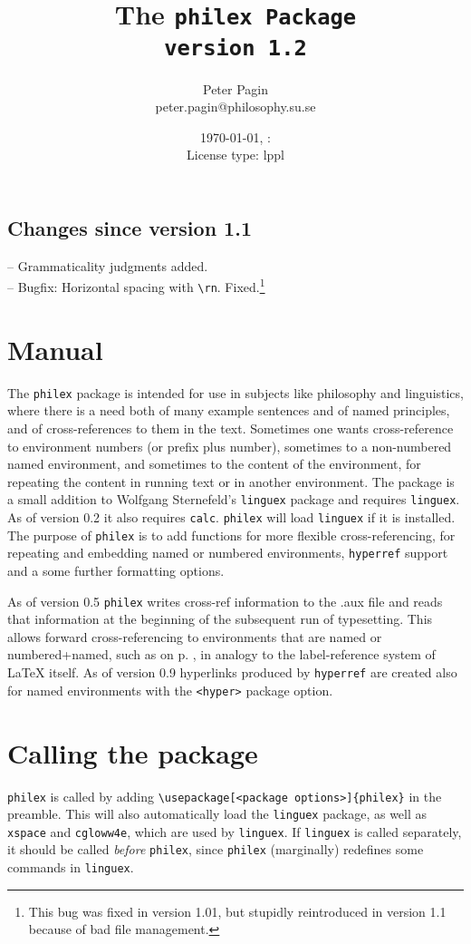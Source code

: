 \documentclass[10pt]{article}
\makeatletter
\newcommand{\emp}{\emph}
\def\now{\nowh:\nowm\\License type: lppl}
\def\aut{Peter Pagin\\ peter.pagin@philosophy.su.se}
\makeatother
\begin{document}
\title{The \tt philex \rm Package \\ version 1.2}
\author{\aut}
\date{\today, \now}
\maketitle
\reversemarginpar
\setlength{\marginparwidth}{3cm}
\subsection*{Changes since version 1.1}
-- Grammaticality judgments added.\\
-- Bugfix: Horizontal spacing with \verb+\rn+. Fixed.\footnote
	{This bug was fixed in version 1.01, but stupidly reintroduced in version 1.1 because of bad file management.}





\section*{Manual}
The \verb+philex+ package is intended for use in subjects like philosophy and linguistics, where there is a need both of many example sentences and of named principles, and of cross-references to them in the text. Sometimes one wants cross-reference to environment numbers (or prefix plus number), sometimes to a non-numbered named environment, and sometimes to the content of the environment, for repeating the content in running text or in another environment. The package is a small addition to Wolfgang Sternefeld's \verb+linguex+ package and requires \verb+linguex+. As of version 0.2 it also requires \verb+calc+. \verb+philex+ will load \verb+linguex+ if it is installed. The purpose of \verb+philex+ is to add functions for more flexible cross-referencing, for repeating and embedding named or numbered environments, \verb+hyperref+ support and a some further formatting options.

As of version 0.5 \verb+philex+ writes cross-ref information to the .aux file and reads that information at the beginning of the subsequent run of typesetting. This allows forward cross-referencing to environments that are named or numbered+named, such as  on p. \pageref{clauses}, 
in analogy to the label-reference system of LaTeX itself. As of version 0.9 hyperlinks produced by \verb+hyperref+ are created also for named environments with the \verb+<hyper>+ package option.

\section{Calling the package}
\verb+philex+ is  called by adding \verb+\usepackage[<package options>]{philex}+ in the preamble. This will also automatically load the \verb+linguex+ package, as well as \verb+xspace+ and \verb+cgloww4e+, which are used by \verb+linguex+. If \verb+linguex+ is called separately, it should be called \emp{before} \verb+philex+, since \verb+philex+ (marginally) redefines some commands in \verb+linguex+.
\end{document}
